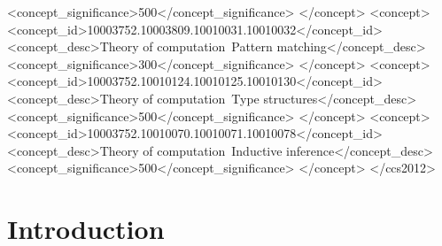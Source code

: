 \documentclass[natbib=false]{jfp}
\newcommand{\genDir}{../paper/_gen}
\begin{document}
\begin{CCSXML}
         <concept_significance>500</concept_significance>
         </concept>
     <concept>
         <concept_id>10003752.10003809.10010031.10010032</concept_id>
         <concept_desc>Theory of computation~Pattern matching</concept_desc>
         <concept_significance>300</concept_significance>
         </concept>
     <concept>
         <concept_id>10003752.10010124.10010125.10010130</concept_id>
         <concept_desc>Theory of computation~Type structures</concept_desc>
         <concept_significance>500</concept_significance>
         </concept>
     <concept>
         <concept_id>10003752.10010070.10010071.10010078</concept_id>
         <concept_desc>Theory of computation~Inductive inference</concept_desc>
         <concept_significance>500</concept_significance>
         </concept>
   </ccs2012>
  \end{CCSXML}
  




\maketitle

\section{Introduction}

\end{document}
